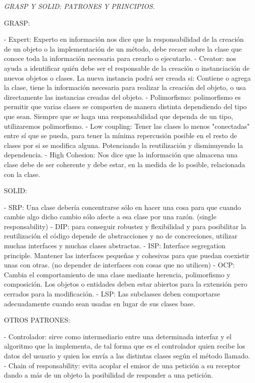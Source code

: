 {\itshape GRASP Y SOLID\+: PATRONES Y PRINCIPIOS.}


\begin{DoxyItemize}
\item GRASP\+: \begin{DoxyVerb}  - Expert: Experto en información nos dice que la responsabilidad de la creación de un objeto o la implementación de un método, debe recaer sobre la clase que conoce toda la información necesaria para crearlo o ejecutarlo.
  - Creator: nos ayuda a identificar quién debe ser el responsable de la creación o instanciación de nuevos objetos o clases. La nueva instancia podrá ser creada si: Contiene o agrega la clase, tiene la información necesaria para realizar la creación del objeto, o usa directamente las instancias creadas del objeto.
  - Polimorfismo:  polimorfismo es permitir que varias clases se comporten de manera distinta dependiendo del tipo que sean. Siempre que se haga una responsabilidad que dependa de un tipo, utilizaremos polimorfismo.
  - Low coupling: Tener las clases lo menos "conectadas" entre sí que se pueda, para tener la mínima repercusión posible en el resto de clases por si se modifica alguna. Potenciando la reutilización y disminuyendo la dependencia.
  - High Cohesion: Nos dice que la información que almacena una clase debe de ser coherente y debe estar, en la medida de lo posible,          relacionada con la clase.  
\end{DoxyVerb}

\item SOLID\+: \begin{DoxyVerb}  - SRP:  Una clase debería concentrarse sólo en hacer una cosa para que cuando cambie algo dicho cambio sólo afecte a esa clase por una razón. (single responsability)
  - DIP: para conseguir robustez y flexibilidad y para posibilitar la reutilización el código depende de abstracciones y no de concreciones, utilizar muchas interfaces y muchas clases abstractas.
  - ISP: Interface segregation principle. Mantener las interfaces pequeñas y cohesivas para que puedan coexistir unas con otras. (no depender de interfaces con cosas que no utilicen) 
  - OCP: Cambia el comportamiento de una clase mediante herencia, polimorfismo y composición. Los objetos o entidades deben estar abiertos para la extensión pero cerrados para la modificación.
  - LSP: Las subclasses deben comportarse adecuadamente cuando sean usadas en lugar de sus clases base. 
\end{DoxyVerb}

\item OTROS PATRONES\+: \begin{DoxyVerb}          - Controlador: sirve como intermediario entre una determinada interfaz y el algoritmo que la implementa, de tal forma que es el controlador quien recibe los datos del usuario y quien los envía a las distintas clases según el método llamado.
          - Chain of responsability: evita acoplar el emisor de una petición a su receptor dando a más de un objeto la posibilidad de responder a una petición.
\end{DoxyVerb}
 
\end{DoxyItemize}